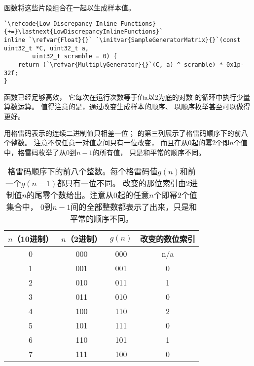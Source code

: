 函数将这些片段组合在一起以生成样本值。
\begin{lstlisting}
`\refcode{Low Discrepancy Inline Functions}{+=}\lastnext{LowDiscrepancyInlineFunctions}`
inline `\refvar{Float}{}` `\initvar{SampleGeneratorMatrix}{}`(const uint32_t *C, uint32_t a,
        uint32_t scramble = 0) {
    return (`\refvar{MultiplyGenerator}{}`(C, a) ^ scramble) * 0x1p-32f;
}
\end{lstlisting}

函数已经足够高效，
它每次在运行次数等于值{\ttfamily a}以2为底的对数
的循环中执行少量算数运算。
值得注意的是，通过改变生成样本的顺序、
以顺序枚举甚至可以做得更好。

用格雷码表示的连续二进制值只相差一位；
的第三列展示了格雷码顺序下的前八个整数。
注意不仅任意一对值之间只有一位改变，
而且在从0起的幂2个即$n$个值中，格雷码枚举了从0到$n-1$的所有值，
只是和平常的顺序不同。
\begin{table}[htbp]
    \centering
    \begin{tabular}{cccc}
        \toprule
        $n$\textbf{（10进制）} & $n$\textbf{（2进制）} & $g(n)$ & \textbf{改变的数位索引} \\
        \midrule
        0                      & 000                   & 000    & n/a                     \\
        1                      & 001                   & 001    & 0                       \\
        2                      & 010                   & 011    & 1                       \\
        3                      & 011                   & 010    & 0                       \\
        4                      & 100                   & 110    & 2                       \\
        5                      & 101                   & 111    & 0                       \\
        6                      & 110                   & 101    & 1                       \\
        7                      & 111                   & 100    & 0                       \\
        \bottomrule
    \end{tabular}
    \caption{格雷码顺序下的前八个整数。每个格雷码值$g(n)$和前一个$g(n-1)$都只有一位不同。
        改变的那位索引由2进制值$n$的尾零个数给出。注意从0起的任意$n$个即幂2个值集合中，
        0到$n-1$间的全部整数都表示了出来，只是和平常的顺序不同。}
    \label{tab:7.4}
\end{table}

